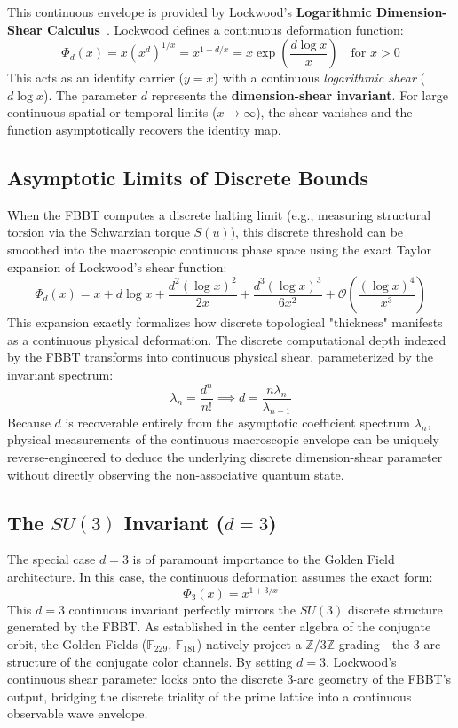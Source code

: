 This continuous envelope is provided by Lockwood's \textbf{Logarithmic Dimension-Shear Calculus}~\cite{lockwood_zpe2025}. Lockwood defines a continuous deformation function:
\begin{equation}
    \Phi_d(x) = x(x^d)^{1/x} = x^{1+d/x} = x \exp\left(\frac{d \log x}{x}\right) \quad \text{for } x > 0
\end{equation}
This acts as an identity carrier ($y = x$) with a continuous \textit{logarithmic shear} ($d \log x$). The parameter $d$ represents the \textbf{dimension-shear invariant}. For large continuous spatial or temporal limits ($x \to \infty$), the shear vanishes and the function asymptotically recovers the identity map.

\subsection{Asymptotic Limits of Discrete Bounds}
When the FBBT computes a discrete halting limit (e.g., measuring structural torsion via the Schwarzian torque $S(u)$), this discrete threshold can be smoothed into the macroscopic continuous phase space using the exact Taylor expansion of Lockwood's shear function:
\begin{equation}
    \Phi_d(x) = x + d \log x + \frac{d^2 (\log x)^2}{2x} + \frac{d^3 (\log x)^3}{6x^2} + \mathcal{O}\left(\frac{(\log x)^4}{x^3}\right)
\end{equation}
This expansion exactly formalizes how discrete topological "thickness" manifests as a continuous physical deformation. The discrete computational depth indexed by the FBBT transforms into continuous physical shear, parameterized by the invariant spectrum:
\begin{equation}
    \lambda_n = \frac{d^n}{n!} \implies d = \frac{n \lambda_n}{\lambda_{n-1}}
\end{equation}
Because $d$ is recoverable entirely from the asymptotic coefficient spectrum $\lambda_n$, physical measurements of the continuous macroscopic envelope can be uniquely reverse-engineered to deduce the underlying discrete dimension-shear parameter without directly observing the non-associative quantum state.

\subsection{The $SU(3)$ Invariant ($d=3$)}
The special case $d=3$ is of paramount importance to the Golden Field architecture. In this case, the continuous deformation assumes the exact form:
\begin{equation}
    \Phi_3(x) = x^{1+3/x}
\end{equation}
This $d=3$ continuous invariant perfectly mirrors the $SU(3)$ discrete structure generated by the FBBT. As established in the center algebra of the conjugate orbit, the Golden Fields ($\mathbb{F}_{229}$, $\mathbb{F}_{181}$) natively project a $\mathbb{Z}/3\mathbb{Z}$ grading---the 3-arc structure of the conjugate color channels. By setting $d=3$, Lockwood's continuous shear parameter locks onto the discrete 3-arc geometry of the FBBT's output, bridging the discrete triality of the prime lattice into a continuous observable wave envelope. 

